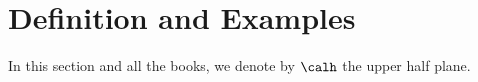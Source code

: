 \section{Definition and Examples}

    In this section and all the books, we denote by \(\calh\) the upper half plane.

    \begin{definition}\label{def: modular form}
        
    \end{definition}